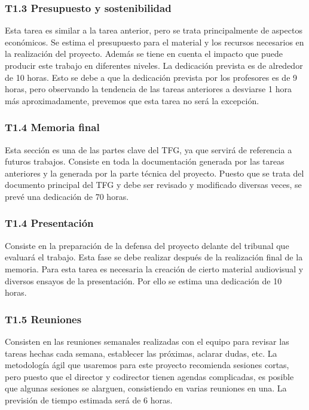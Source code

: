 \subsubsection*{T1.3 Presupuesto y sostenibilidad}
Esta tarea es similar a la tarea anterior, pero se trata principalmente de aspectos económicos. Se estima el presupuesto para el material y los recursos necesarios en la realización del proyecto. Además se tiene en cuenta el impacto que puede producir este trabajo en diferentes niveles. La dedicación prevista es de alrededor de 10 horas. Esto se debe a que la dedicación prevista por los profesores es de 9 horas, pero observando la tendencia de las tareas anteriores a desviarse 1 hora más aproximadamente, prevemos que esta tarea no será la excepción.

\subsubsection*{T1.4 Memoria final}
Esta sección es una de las partes clave del TFG, ya que servirá de referencia a futuros trabajos. Consiste en toda la documentación generada por las tareas anteriores y la generada por la parte técnica del proyecto. Puesto que se trata del documento principal del TFG y debe ser revisado y modificado diversas veces, se prevé una dedicación de 70 horas.

\subsubsection*{T1.4 Presentación}
Consiste en la preparación de la defensa del proyecto delante del tribunal que evaluará el trabajo. Esta fase se debe realizar después de la realización final de la memoria. Para esta tarea es necesaria la creación de cierto material audiovisual y diversos ensayos de la presentación. Por ello se estima una dedicación de 10 horas.

\subsubsection*{T1.5 Reuniones}
Consisten en las reuniones semanales realizadas con el equipo para revisar las tareas hechas cada semana, establecer las próximas, aclarar dudas, etc. La metodología ágil que usaremos para este proyecto recomienda sesiones cortas, pero puesto que el director y codirector tienen agendas complicadas, es posible que algunas sesiones se alarguen, consistiendo en varias reuniones en una. La previsión de tiempo estimada será de 6 horas.

